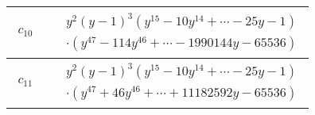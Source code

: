 \documentclass[1p]{elsarticle_modified}
\theoremstyle{definition}
\begin{document}
\begin{tabular}{m{50pt}|m{274pt}}
\hline $$\begin{aligned}c_{10}\end{aligned}$$&$\begin{aligned}
&y^2(y-1)^3(y^{15}-10 y^{14}+\cdots-25 y-1)\\
&\cdot(y^{47}-114 y^{46}+\cdots-1990144 y-65536)
\end{aligned}$\\
\hline $$\begin{aligned}c_{11}\end{aligned}$$&$\begin{aligned}
&y^2(y-1)^3(y^{15}-10 y^{14}+\cdots-25 y-1)\\
&\cdot(y^{47}+46 y^{46}+\cdots+11182592 y-65536)
\end{aligned}$\\
\hline
\end{tabular}
\vskip 2pc
\end{document}
